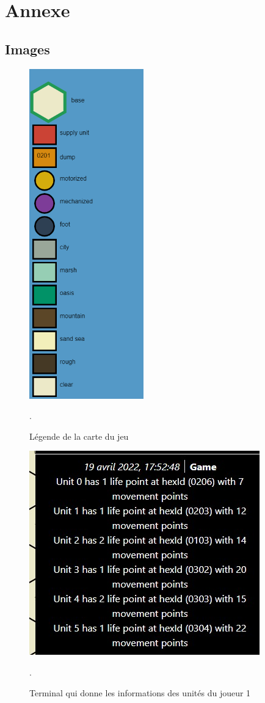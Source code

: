 \section{Annexe}

\subsection{Images}

\begin{figure}[H]
    \centering
    \includegraphics[scale=0.8]{data/Map_Legend.png}
    \caption{Légende de la carte du jeu}.
    \label{fig:map_legend}
\end{figure}

\begin{figure}[H]
    \centering
    \includegraphics[scale=0.6]{data/info_units.jpg}
    \caption{Terminal qui donne les informations des unités du joueur 1 }.
    \label{fig:units_command}
\end{figure}

